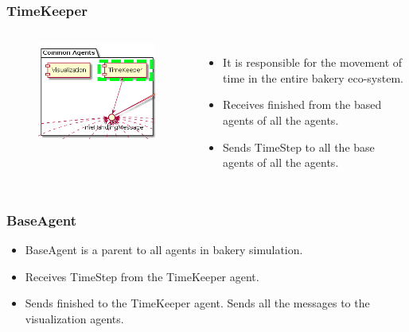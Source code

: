 \documentclass{beamer}
\begin{document}
\begin{frame}
    \frametitle{\huge{TimeKeeper}}
    \begin{columns}[t]
        \begin{figure}[H]
            \centering
            \includegraphics[width=0.75\linewidth]{common_TimeKeeper.png}
        \end{figure}
            \begin{itemize}
                \item It is responsible for the movement of time in the entire bakery eco-system.
                \item Receives finished from the based agents of all the agents.
                \item Sends TimeStep to all the base agents of all the agents.
            \end{itemize}
    \end{columns}
\end{frame}
\begin{frame}
    \frametitle{\huge{BaseAgent}}
            \begin{itemize}
                \item BaseAgent is a parent to all agents in bakery simulation.
                \item Receives TimeStep from the TimeKeeper agent.
                \item Sends finished to the TimeKeeper agent. Sends all the messages to the visualization agents.
            \end{itemize}
\end{frame}
\end{document}
